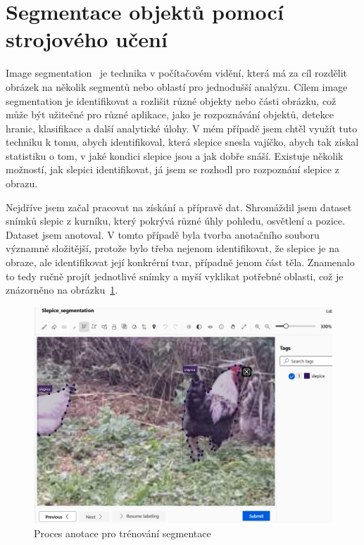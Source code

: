 \section{Segmentace objektů pomocí strojového učení}\label{sec:klasifikace-a-segmentace-objektu-pomoci-strojoveho-uceni}

Image segmentation~\cite{segmentace} je technika v počítačovém vidění, která má za cíl rozdělit obrázek na několik segmentů nebo oblastí pro jednodušší analýzu.
Cílem image segmentation je identifikovat a rozlišit různé objekty nebo části obrázku, což může být užitečné pro různé aplikace, jako je rozpoznávání objektů, detekce hranic, klasifikace a další analytické úlohy.
V mém případě jsem chtěl využít tuto techniku k tomu, abych identifikoval, která slepice snesla vajíčko, abych tak získal statistiku o tom, v jaké kondici slepice jsou a jak dobře snáší.
Existuje několik možností, jak slepici identifikovat, já jsem se rozhodl pro rozpoznání slepice z obrazu.

Nejdříve jsem začal pracovat na získání a přípravě dat.
Shromáždil jsem dataset snímků slepic z kurníku, který pokrývá různé úhly pohledu, osvětlení a pozice.
Dataset jsem anotoval.
V tomto případě byla tvorba anotačního souboru významně složitější, protože bylo třeba nejenom identifikovat, že slepice je na obraze, ale identifikovat její konkrérní tvar, případně jenom část těla.
Znamenalo to tedy ručně projít jednotlivé snímky a myší vyklikat potřebné oblasti, což je znázorněno na obrázku~\ref{fig:label_segmentation}.
\begin{figure}[H]
    \centering
    \includegraphics[width=1.0\textwidth]{img/label_segmentation}
    \caption{Proces anotace pro trénování segmentace}
    \label{fig:label_segmentation}
\end{figure}

